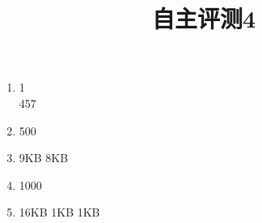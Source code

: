 \documentclass[11pt]{article}
\title{自主评测4}
\date{}
\author{}
\begin{document}
\maketitle

\begin{enumerate}
    \item 1     \\
          457    
    \item 500
    \item 9KB \quad 8KB %
    \item 1000
    \item 16KB \quad 1KB \quad 1KB
\end{enumerate}
\end{document}

